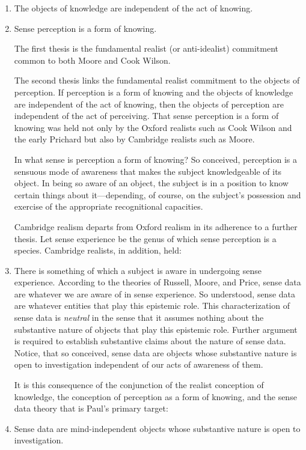 \documentclass[11pt]{article}
\begin{document}
\begin{enumerate}
    \item The objects of knowledge are independent of the act of knowing.
    \item Sense perception is a form of knowing. 

The first thesis is the fundamental realist (or anti-idealist) commitment common to both Moore and Cook Wilson.  

The second thesis links the fundamental realist commitment to the objects of perception. If perception is a form of knowing and the objects of knowledge are independent of the act of knowing, then the objects of perception are independent of the act of perceiving. That sense perception is a form of knowing was held not only by the Oxford realists such as Cook Wilson and the early Prichard but also by Cambridge realists such as Moore. 

In what sense is perception a form of knowing? So conceived, perception is a sensuous mode of awareness that makes the subject knowledgeable of its object. In being so aware of an object, the subject is in a position to know certain things about it---depending, of course, on the subject's possession and exercise of the appropriate recognitional capacities.

Cambridge realism departs from Oxford realism in its adherence to a further thesis. Let sense experience be the genus of which sense perception is a species. Cambridge realists, in addition, held:
    \item There is something of which a subject is aware in undergoing sense experience.
According to the theories of Russell, Moore, and Price, sense data are whatever we are aware of in sense experience. So understood, sense data are whatever entities that play this epistemic role. This characterization of sense data is \emph{neutral} in the sense that it assumes nothing about the substantive nature of objects that play this epistemic role. Further argument is required to establish substantive claims about the nature of sense data. Notice, that so conceived, sense data are objects whose substantive nature is open to investigation independent of our acts of awareness of them. 

It is this consequence of the conjunction of the realist conception of knowledge, the conception of perception as a form of knowing, and the sense data theory that is Paul's primary target:
    \item Sense data are mind-independent objects whose substantive nature is open to investigation.
\end{enumerate}
\end{document}
